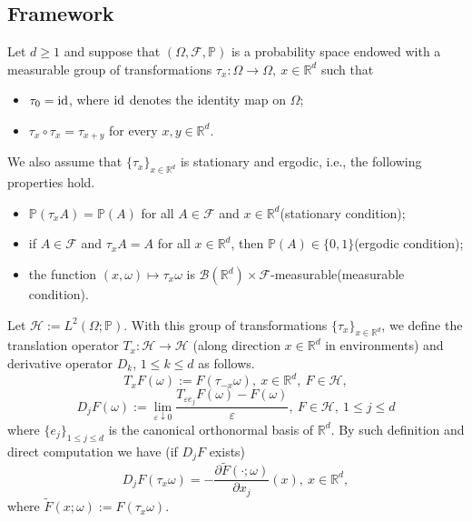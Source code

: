 \documentclass[11pt,draft, reqno]{amsart}
\renewcommand{\geq}{\geqslant}
\renewcommand{\le}{\leqslant}
\newcommand{\HH}{\mathcal{H}}
\newcommand{\R}{\mathds R}
\newcommand{\e}{\varepsilon}
\newcommand{\Pp}{\mathds P}
\newcommand{\w}{\omega}
\theoremstyle{definition}
\numberwithin{equation}{section}
\begin{document}
\subsection{Framework}
 Let $d\geq 1$ and suppose that $(\Omega, \mathcal{F}, \Pp)$ is a probability space
 endowed with a measurable group of transformations $\tau_x:\Omega \to \Omega,\ x\in \R^d$ such that
\begin{itemize}
\item [(a)] $\tau_0={\rm id}$, where ${\rm id}$ denotes the identity map on $\Omega$;

\item [(b)] $\tau_x \circ \tau_x=\tau_{x+y}$  for every $x, y\in \R^d$.
\end{itemize}
We also assume that $\{\tau_x\}_{x\in \R^d}$ is stationary and ergodic, i.e., the following properties hold.
\begin{itemize}
\item[(i)]  $\Pp(\tau_x A)=\Pp(A)$ for all $A\in \mathcal{F}$ and $x\in \R^d$(stationary condition);

\item[(ii)] if $A\in \mathcal{F}$ and $\tau_xA=A$ for all $x\in \R^d$, then $\Pp(A)\in \{0,1\}$(ergodic condition);

\item[(iii)] the function $(x,\w)\mapsto \tau_x \w$ is $\mathscr{B}(\R^d)\times \mathcal{F}$-measurable(measurable condition).
\end{itemize}
Let $\HH:=L^2(\Omega;\Pp)$. With this group of transformations $\{\tau_x\}_{x\in \R^d}$, we define the translation operator $T_x: \HH\to \HH$
(along direction $x\in \R^d$ in environments) and derivative operator $D_k$, $1\le k \le d$ as follows.
\begin{equation*}
T_x F(\w):=F(\tau_{-x} \w),\ x\in \R^d,\ F\in \HH,
\end{equation*}
\begin{equation*}
D_j F(\w):=\lim_{\e\downarrow 0}\frac{T_{\e e_j}F(\w)-F(\w)}{\e},\ F\in \HH,\ 1\le j \le d
\end{equation*}
where $\{e_j\}_{1\le j \le d}$ is the canonical orthonormal basis of $\R^d$. By such definition and direct computation we have
(if $D_jF$ exists)
\begin{equation*}%
D_j F(\tau_x \w)=-\frac{\partial\tilde F(\cdot;\w) }{\partial x_j}(x),\ x\in \R^d,
\end{equation*}
where $\tilde F(x;\w):=F(\tau_x \w)$.
\end{document}
